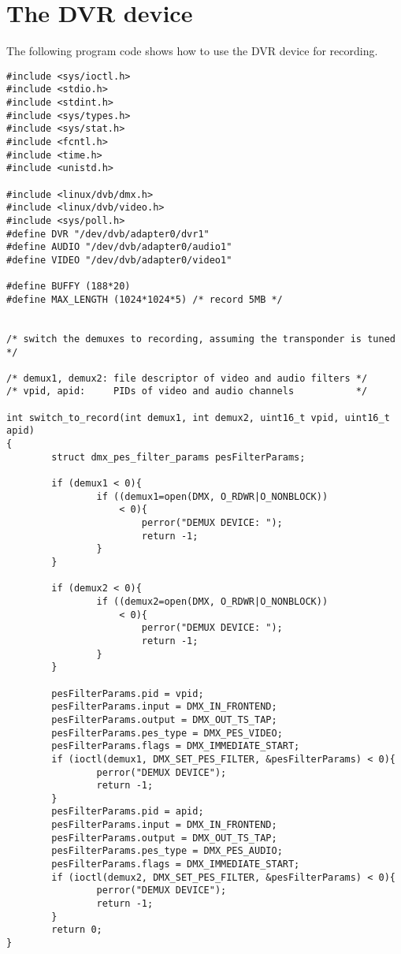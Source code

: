 \section{The DVR device}
The following program code shows how to use the DVR device for
recording.

{\small
\begin{verbatim}
#include <sys/ioctl.h>
#include <stdio.h>
#include <stdint.h>
#include <sys/types.h>
#include <sys/stat.h>
#include <fcntl.h>
#include <time.h>
#include <unistd.h>

#include <linux/dvb/dmx.h>
#include <linux/dvb/video.h>
#include <sys/poll.h>
#define DVR "/dev/dvb/adapter0/dvr1"
#define AUDIO "/dev/dvb/adapter0/audio1"
#define VIDEO "/dev/dvb/adapter0/video1"

#define BUFFY (188*20)
#define MAX_LENGTH (1024*1024*5) /* record 5MB */


/* switch the demuxes to recording, assuming the transponder is tuned */

/* demux1, demux2: file descriptor of video and audio filters */
/* vpid, apid:     PIDs of video and audio channels           */

int switch_to_record(int demux1, int demux2, uint16_t vpid, uint16_t apid)
{
        struct dmx_pes_filter_params pesFilterParams; 

        if (demux1 < 0){
                if ((demux1=open(DMX, O_RDWR|O_NONBLOCK)) 
                    < 0){
                        perror("DEMUX DEVICE: ");
                        return -1;
                }
        }

        if (demux2 < 0){
                if ((demux2=open(DMX, O_RDWR|O_NONBLOCK)) 
                    < 0){
                        perror("DEMUX DEVICE: ");
                        return -1;
                }
        }

        pesFilterParams.pid = vpid;
        pesFilterParams.input = DMX_IN_FRONTEND; 
        pesFilterParams.output = DMX_OUT_TS_TAP; 
        pesFilterParams.pes_type = DMX_PES_VIDEO; 
        pesFilterParams.flags = DMX_IMMEDIATE_START;
        if (ioctl(demux1, DMX_SET_PES_FILTER, &pesFilterParams) < 0){
                perror("DEMUX DEVICE");
                return -1; 
        }
        pesFilterParams.pid = apid; 
        pesFilterParams.input = DMX_IN_FRONTEND; 
        pesFilterParams.output = DMX_OUT_TS_TAP; 
        pesFilterParams.pes_type = DMX_PES_AUDIO; 
        pesFilterParams.flags = DMX_IMMEDIATE_START;
        if (ioctl(demux2, DMX_SET_PES_FILTER, &pesFilterParams) < 0){
                perror("DEMUX DEVICE");
                return -1; 
        }
        return 0;
}


\end{verbatim}}
